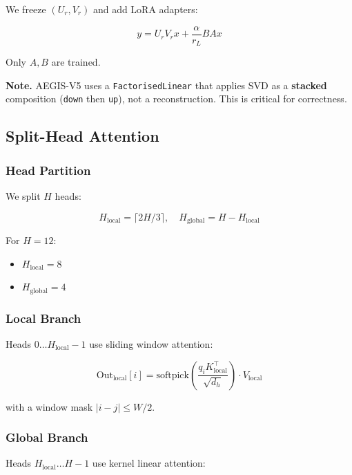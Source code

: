 We freeze $(U_r, V_r)$ and add LoRA adapters:

\begin{equation}
y = U_r V_r x + \frac{\alpha}{r_L} B A x
\end{equation}

Only $A, B$ are trained.

\textbf{Note.} AEGIS-V5 uses a \texttt{FactorisedLinear} that applies SVD as a \textbf{stacked} 
composition (\texttt{down} then \texttt{up}), not a reconstruction. This is critical for 
correctness.

\subsection{Split-Head Attention}

\subsubsection{Head Partition}

We split $H$ heads:

\begin{equation}
H_\text{local} = \lceil 2H/3 \rceil, \quad
H_\text{global} = H - H_\text{local}
\end{equation}

For $H = 12$:
\begin{itemize}
\item $H_\text{local} = 8$
\item $H_\text{global} = 4$

\end{itemize}
\subsubsection{Local Branch}

Heads $0 \ldots H_\text{local} - 1$ use sliding window attention:

\begin{equation}
\text{Out}_\text{local}[i] = \text{softpick}\!\left(\frac{q_i K_\text{local}^\top}{\sqrt{d_h}}\right) \cdot V_\text{local}
\end{equation}

with a window mask $|i - j| \leq W/2$.

\subsubsection{Global Branch}

Heads $H_\text{local} \ldots H - 1$ use kernel linear attention:

